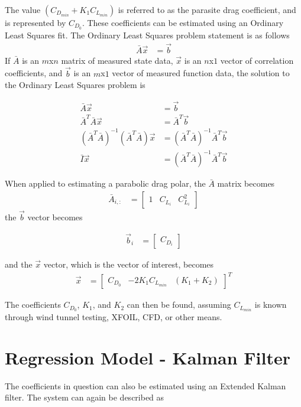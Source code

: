 The value $(C_{D_{min}}+K_1C_{L_{min}})$ is referred to as the parasite drag coefficient, and is represented by $C_{D_0}$\cite{raymer}.
These coefficients can be estimated using an Ordinary Least Squares fit. The Ordinary Least Squares problem statement is as follows
\begin{align}
\bar{A}\vec{x} &= \vec{b}
\end{align}
If $\bar{A}$ is an $m$x$n$ matrix of measured state data, $\vec{x}$ is an $n$x$1$ vector of correlation coefficients, and $\vec{b}$ is an $m$x$1$ vector of measured function data, the solution to the Ordinary Least Squares problem is 

\begin{align}
\bar{A}\vec{x}&=\vec{b}\\
\bar{A}^T\bar{A}\vec{x} &= \bar{A}^T\vec{b}\\
(\bar{A}^T\bar{A})^{-1}(\bar{A}^T \bar{A})\vec{x} &= (\bar{A}^T\bar{A})^{-1}\bar{A}^T\vec{b}\\
\bar{I}\vec{x} &=(\bar{A}^T\bar{A})^{-1}\bar{A}^T\vec{b}
\end{align}

When applied to estimating a parabolic drag polar, the $\bar{A}$ matrix becomes
\begin{align}
\bar{A}_{i,:} &= 
\begin{bmatrix}
1 & C_{L_i} & C^2_{L_i}
\end{bmatrix}
\end{align}
the $\vec{b}$ vector becomes

\begin{align}
\vec{b}_i &=
\begin{bmatrix}
C_{D_i}
\end{bmatrix}
\end{align}

and the $\vec{x}$ vector, which is the vector of interest, becomes
\begin{align}
\vec{x} &=
\begin{bmatrix}
C_{D_0} & -2K_1C_{L_{min}} & (K_1+K_2)
\end{bmatrix}^T
\end{align}

The coefficients $C_{D_0}$, $K_1$, and $K_2$ can then be found, assuming $C_{L_{min}}$ is known through wind tunnel testing, XFOIL, CFD, or other means.

\section{Regression Model - Kalman Filter}
The coefficients in question can also be estimated using an Extended Kalman filter. The system can again be described as 

